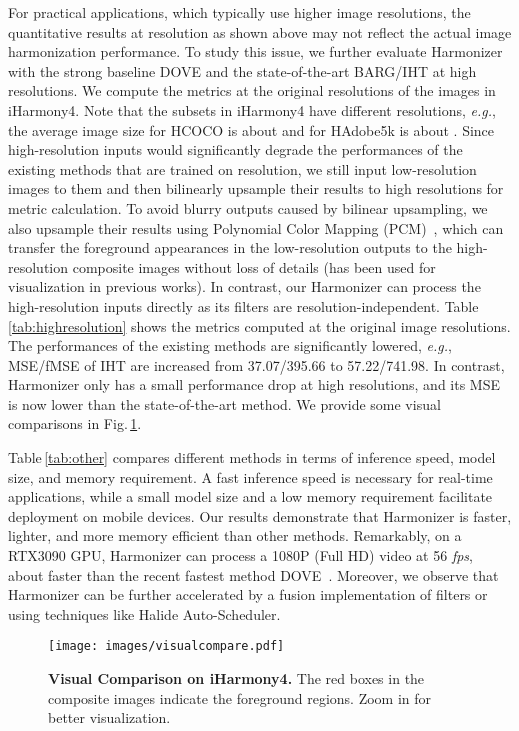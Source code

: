 \documentclass[runningheads]{llncs}
\newcommand{\ke}[1]{{\color{black}#1}}
\begin{document}
For practical applications, which typically use higher image resolutions, the quantitative results at  resolution as shown above may not reflect the actual image harmonization performance. To study this issue, we further evaluate Harmonizer with the strong baseline DOVE and the state-of-the-art BARG/IHT at high resolutions. We compute the metrics at the original resolutions of the images in iHarmony4. Note that the subsets in iHarmony4 have different resolutions, {\it e.g.}, the average image size for HCOCO is about  and for HAdobe5k is about .
Since high-resolution inputs would significantly degrade the performances of the existing methods \ke{that are trained on  resolution}, we still input low-resolution images to them and then bilinearly upsample their results to high resolutions for metric calculation. \ke{To avoid blurry outputs caused by bilinear upsampling,}
we also upsample their results using Polynomial Color Mapping (PCM)~\cite{afifi2020deepWB}, which can transfer the foreground appearances in the low-resolution outputs to the high-resolution composite images without loss of details (has been used for visualization in previous works). In contrast, our Harmonizer can process the high-resolution inputs directly as its filters are resolution-independent.
Table\,\ref{tab:highresolution} shows the metrics computed at the original image resolutions. The performances of the existing methods are significantly lowered, {\it e.g.}, MSE/fMSE of IHT are increased from 37.07/395.66 to 57.22/741.98. In contrast, Harmonizer only has a small performance drop at high resolutions, and its MSE is now  lower than the state-of-the-art method. We provide some visual comparisons in Fig.\,\ref{fig:visual}.

Table\,\ref{tab:other} compares different methods in terms of inference speed, model size, and memory requirement. A fast inference speed is necessary for real-time applications, while a small model size and a low memory requirement facilitate deployment on mobile devices. 
Our results demonstrate that Harmonizer is faster, lighter, and more memory efficient than other methods. Remarkably, on a RTX3090 GPU, Harmonizer can process a 1080P (Full HD) video at 56 {\it fps}, about  faster than the recent fastest method DOVE~\cite{DoveNet}. Moreover, we observe that Harmonizer can be further accelerated by a fusion implementation of filters or using techniques like Halide Auto-Scheduler.



 \begin{figure}[t]
\centering
\texttt{[image: images/visualcompare.pdf]}
{\begin{center}
\vspace{-0.5cm}
\caption{\textbf{Visual Comparison on iHarmony4.} The red boxes in the composite images indicate the foreground regions. Zoom in for better visualization.}
\label{fig:visual}
\end{center}
}
\vspace{-0.7cm}
\end{figure}
\end{document}
